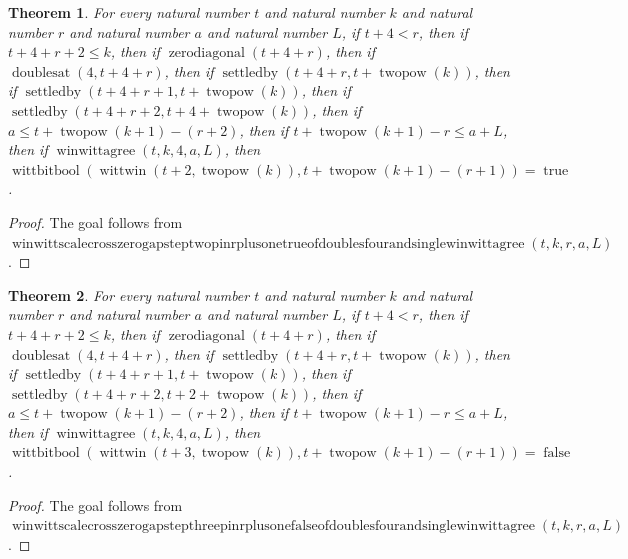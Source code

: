 \documentclass[11pt]{article}
\newtheorem{theorem}{Theorem}[section]
\theoremstyle{definition}
\begin{document}
\begin{theorem}
\label{ll:paper:winwitt-scale-cross-zero-gap-step-two-pin-r-plus-one-true-of-doubles-four-and-single-winwittagree}
For every natural number \(t\) and natural number \(k\) and natural number \(r\) and natural number \(a\) and natural number \(L\), if \(t + 4 < r\), then if \(t + 4 + r + 2 \le k\), then if \(\operatorname{zerodiagonal}(t + 4 + r)\), then if \(\operatorname{doublesat}(4, t + 4 + r)\), then if \(\operatorname{settledby}(t + 4 + r, t + \operatorname{twopow}(k))\), then if \(\operatorname{settledby}(t + 4 + r + 1, t + \operatorname{twopow}(k))\), then if \(\operatorname{settledby}(t + 4 + r + 2, t + 4 + \operatorname{twopow}(k))\), then if \(a \le t + \operatorname{twopow}(k + 1) - (r + 2)\), then if \(t + \operatorname{twopow}(k + 1) - r \le a + L\), then if \(\operatorname{winwittagree}(t, k, 4, a, L)\), then \(\operatorname{wittbitbool}(\operatorname{wittwin}(t + 2, \operatorname{twopow}(k)), t + \operatorname{twopow}(k + 1) - (r + 1)) = \operatorname{true}\).
\end{theorem}
\begin{proof}
The goal follows from \(\operatorname{winwittscalecrosszerogapsteptwopinrplusonetrueofdoublesfourandsinglewinwittagree}(t, k, r, a, L)\).
\end{proof}
\begin{theorem}
\label{ll:paper:winwitt-scale-cross-zero-gap-step-three-pin-r-plus-one-false-of-doubles-four-and-single-winwittagree}
For every natural number \(t\) and natural number \(k\) and natural number \(r\) and natural number \(a\) and natural number \(L\), if \(t + 4 < r\), then if \(t + 4 + r + 2 \le k\), then if \(\operatorname{zerodiagonal}(t + 4 + r)\), then if \(\operatorname{doublesat}(4, t + 4 + r)\), then if \(\operatorname{settledby}(t + 4 + r, t + \operatorname{twopow}(k))\), then if \(\operatorname{settledby}(t + 4 + r + 1, t + \operatorname{twopow}(k))\), then if \(\operatorname{settledby}(t + 4 + r + 2, t + 2 + \operatorname{twopow}(k))\), then if \(a \le t + \operatorname{twopow}(k + 1) - (r + 2)\), then if \(t + \operatorname{twopow}(k + 1) - r \le a + L\), then if \(\operatorname{winwittagree}(t, k, 4, a, L)\), then \(\operatorname{wittbitbool}(\operatorname{wittwin}(t + 3, \operatorname{twopow}(k)), t + \operatorname{twopow}(k + 1) - (r + 1)) = \operatorname{false}\).
\end{theorem}
\begin{proof}
The goal follows from \(\operatorname{winwittscalecrosszerogapstepthreepinrplusonefalseofdoublesfourandsinglewinwittagree}(t, k, r, a, L)\).
\end{proof}
\end{document}
